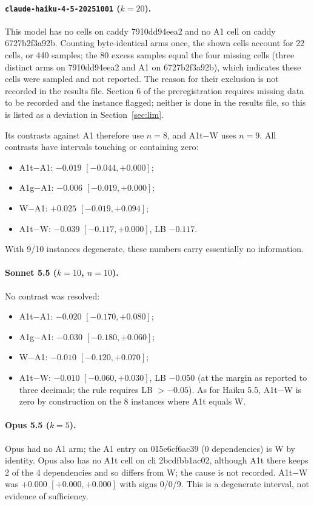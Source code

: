 \documentclass[10pt]{article}
\begin{document}
\paragraph{\texttt{claude-haiku-4-5-20251001} ($k=20$).} This model has no cells on caddy 7910dd94eea2 and no A1 cell on caddy 6727b2f3a92b. Counting byte-identical arms once, the shown cells account for 22 cells, or 440 samples; the 80 excess samples equal the four missing cells (three distinct arms on 7910dd94eea2 and A1 on 6727b2f3a92b), which indicates these cells were sampled and not reported. The reason for their exclusion is not recorded in the results file. Section 6 of the preregistration requires missing data to be recorded and the instance flagged; neither is done in the results file, so this is listed as a deviation in Section~\ref{sec:lim}.

Its contrasts against A1 therefore use $n=8$, and A1t$-$W uses $n=9$. All contrasts have intervals touching or containing zero:
\begin{itemize}
\item A1t$-$A1: $-0.019$ $[-0.044, +0.000]$;
\item A1g$-$A1: $-0.006$ $[-0.019, +0.000]$;
\item W$-$A1: $+0.025$ $[-0.019, +0.094]$;
\item A1t$-$W: $-0.039$ $[-0.117, +0.000]$, LB $-0.117$.
\end{itemize}
With 9/10 instances degenerate, these numbers carry essentially no information.

\paragraph{Sonnet 5.5 ($k=10$, $n=10$).} No contrast was resolved:
\begin{itemize}
\item A1t$-$A1: $-0.020$ $[-0.170, +0.080]$;
\item A1g$-$A1: $-0.030$ $[-0.180, +0.060]$;
\item W$-$A1: $-0.010$ $[-0.120, +0.070]$;
\item A1t$-$W: $-0.010$ $[-0.060, +0.030]$, LB $-0.050$ (at the margin as reported to three decimals; the rule requires LB $> -0.05$). As for Haiku 5.5, A1t$-$W is zero by construction on the 8 instances where A1t equals W.
\end{itemize}

\paragraph{Opus 5.5 ($k=5$).} Opus had no A1 arm; the A1 entry on 015e6cf6ac39 (0 dependencies) is W by identity. Opus also has no A1t cell on cli 2bcdfbb1ac02, although A1t there keeps 2 of the 4 dependencies and so differs from W; the cause is not recorded. A1t$-$W was $+0.000$ $[+0.000, +0.000]$ with signs 0/0/9. This is a degenerate interval, not evidence of sufficiency.
\end{document}
